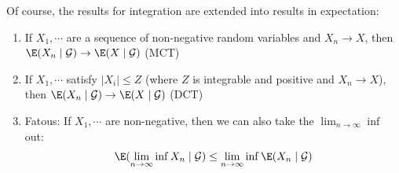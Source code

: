 \par\bigskip
\noindent Of course, the results for integration are extended into results in expectation:
\par\bigskip
\begin{theo}[]{}
  \begin{enumerate}[leftmargin=*]
    \item If $X_1,\cdots$ are a sequence of non-negative random variables and $X_n\to X$, then $\E(X_n\mid\mathcal{G})\to \E(X\mid\mathcal{G})$ (MCT)
    \item If $X_1,\cdots$ satisfy $\left|X_i\right|\leq Z$ (where $Z$ is integrable and positive and $X_n\to X$), then $\E(X_n\mid\mathcal{G})\to\mathcal \E(X\mid\mathcal{G})$ (DCT)
    \item Fatous: If $X_1,\cdots$ are non-negative, then we can also take the $\lim_{n\to\infty}\inf$ out:
      \begin{equation*}
        \begin{gathered}
          \E(\lim_{n\to\infty}\inf X_n\mid\mathcal{G})\leq\lim_{n\to\infty}\inf\E(X_n\mid\mathcal{G})
        \end{gathered}
      \end{equation*}
  \end{enumerate}
\end{theo}
